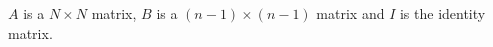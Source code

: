 $A$ is a $N \times N$ matrix, $B$ is a $(n-1) \times (n-1)$ matrix and $I$ is the identity matrix.



